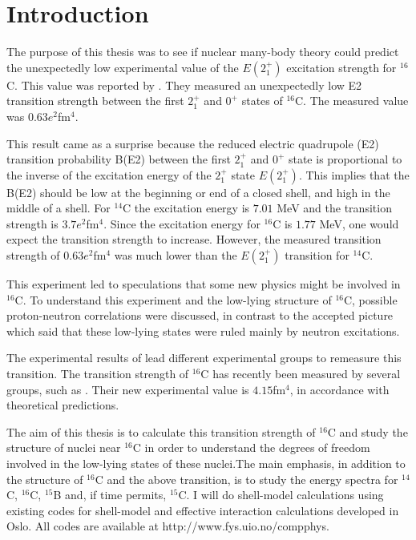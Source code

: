 \chapter{Introduction}
%

The purpose of this thesis was to see if nuclear many-body theory could predict
the unexpectedly low experimental value of the $E(2_1^+)$ excitation strength
for $^{16}$C. This value was reported by \citet{16CLifetime}. They measured an
unexpectedly low E2 transition strength between the first $2_1^+$ and $0^+$
states of $^{16}$C. The measured value was $0.63 e^2$fm$^4$.

This result came as a surprise because the reduced electric quadrupole (E2)
transition probability B(E2) between the first $2_1^+$ and $0^+$ state is
proportional to the inverse of the excitation energy of the $2_1^+$ state
$E(2_1^+)$. This implies that the B(E2) should be low at the beginning or end
of a closed shell, and high in the middle of a shell. For $^{14}$C the
excitation energy is $7.01$ MeV and the transition strength is $3.7 e^2$fm$^4$.
Since the excitation energy for $^{16}$C is $1.77$ MeV, one would expect the
transition strength to increase. However, the measured transition strength of
$0.63 e^2$fm$^4$ was much lower than the $E(2_1^+)$ transition for $^{14}$C.

This experiment led to speculations that some new physics might be
involved in $^{16}$C. To understand this experiment and  the low-lying structure of 
$^{16}$C, possible proton-neutron  correlations were discussed, in contrast to 
the accepted picture  which said that  these low-lying states
were ruled mainly by neutron excitations.

The experimental results of \citep{16CLifetime} lead different experimental
groups to remeasure this transition. The transition strength of $^{16}$C has
recently been measured by several groups, such as \citet{16CE2}. Their new experimental value is
$4.15$fm$^4$, in accordance with theoretical predictions. 

The aim of this thesis is to calculate this transition strength of $^{16}$C
and study the structure of nuclei near $^{16}$C in order to understand the degrees
of freedom involved in the low-lying states of these nuclei.The main emphasis, in addition to the structure of
 $^{16}$C and the above transition, is to study the energy spectra for $^{14}$C, $^{16}$C,
$^{15}$B and, if time permits, $^{15}$C.
I will do shell-model calculations using existing codes for shell-model and effective
interaction calculations developed in Oslo. All codes are available at http://www.fys.uio.no/compphys.



